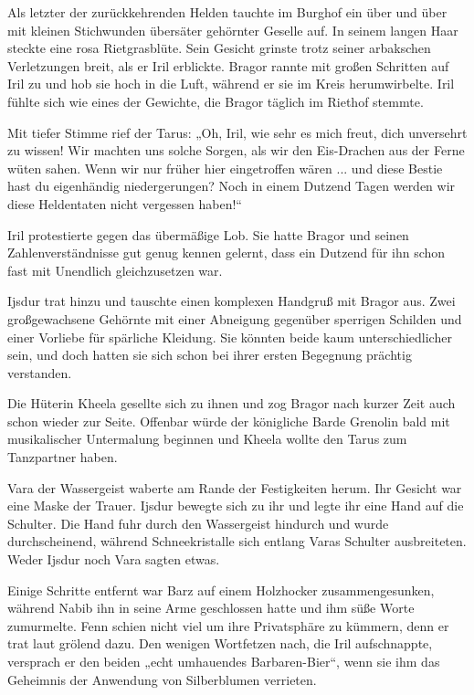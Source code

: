 Als letzter der zurückkehrenden Helden tauchte im Burghof ein über und über mit kleinen Stichwunden übersäter gehörnter Geselle auf. In seinem langen Haar steckte eine rosa Rietgrasblüte. Sein Gesicht grinste trotz seiner arbakschen Verletzungen breit, als er Iril erblickte. Bragor rannte mit großen Schritten auf Iril zu und hob sie hoch in die Luft, während er sie im Kreis herumwirbelte. Iril fühlte sich wie eines der Gewichte, die Bragor täglich im Riethof stemmte.

Mit tiefer Stimme rief der Tarus: „Oh, Iril, wie sehr es mich freut, dich unversehrt zu wissen! Wir machten uns solche Sorgen, als wir den Eis-Drachen aus der Ferne wüten sahen. Wenn wir nur früher hier eingetroffen wären ... und diese Bestie hast du eigenhändig niedergerungen? Noch in einem Dutzend Tagen werden wir diese Heldentaten nicht vergessen haben!“

Iril protestierte gegen das übermäßige Lob. Sie hatte Bragor und seinen Zahlenverständnisse gut genug kennen gelernt, dass ein Dutzend für ihn schon fast mit Unendlich gleichzusetzen war.

Ijsdur trat hinzu und tauschte einen komplexen Handgruß mit Bragor aus. Zwei großgewachsene Gehörnte mit einer Abneigung gegenüber sperrigen Schilden und einer Vorliebe für spärliche Kleidung. Sie könnten beide kaum unterschiedlicher sein, und doch hatten sie sich schon bei ihrer ersten Begegnung prächtig verstanden.

Die Hüterin Kheela gesellte sich zu ihnen und zog Bragor nach kurzer Zeit auch schon wieder zur Seite. Offenbar würde der königliche Barde Grenolin bald mit musikalischer Untermalung beginnen und Kheela wollte den Tarus zum Tanzpartner haben.

Vara der Wassergeist waberte am Rande der Festigkeiten herum. Ihr Gesicht war eine Maske der Trauer. Ijsdur bewegte sich zu ihr und legte ihr eine Hand auf die Schulter. Die Hand fuhr durch den Wassergeist hindurch und wurde durchscheinend, während Schneekristalle sich entlang Varas Schulter ausbreiteten. Weder Ijsdur noch Vara sagten etwas.

Einige Schritte entfernt war Barz auf einem Holzhocker zusammengesunken, während Nabib ihn in seine Arme geschlossen hatte und ihm süße Worte zumurmelte. Fenn schien nicht viel um ihre Privatsphäre zu kümmern, denn er trat laut grölend dazu. Den wenigen Wortfetzen nach, die Iril aufschnappte, versprach er den beiden „echt umhauendes Barbaren-Bier“, wenn sie ihm das Geheimnis der Anwendung von Silberblumen verrieten.

